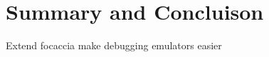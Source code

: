 
\chapter{Summary and Concluison}\label{chapter:summary_and_concluison}



Extend focaccia
make debugging emulators easier